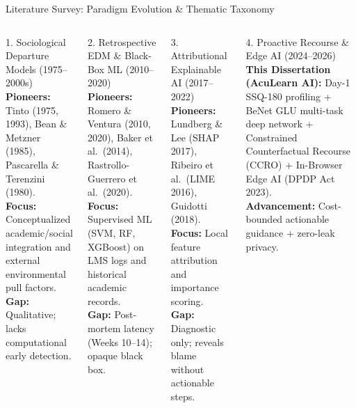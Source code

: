 \documentclass{beamer}
\begin{document}
\begin{frame}[t]{Literature Survey: Paradigm Evolution \& Thematic Taxonomy}
  \begin{columns}[T]
    \begin{block}{\scriptsize 1. Sociological Departure Models (1975--2000s)}
      \fontsize{5.4pt}{6.8pt}\selectfont
      \textbf{Pioneers:} Tinto (1975, 1993), Bean \& Metzner (1985), Pascarella \& Terenzini (1980).\\[2pt]
      \textbf{Focus:} Conceptualized academic/social integration and external environmental pull factors.\\[2pt]
      \textbf{Gap:} Qualitative; lacks computational early detection.
    \end{block}
    \vspace{4pt}
    \begin{block}{\scriptsize 2. Retrospective EDM \& Black-Box ML (2010--2020)}
      \fontsize{5.4pt}{6.8pt}\selectfont
      \textbf{Pioneers:} Romero \& Ventura (2010, 2020), Baker et al.\ (2014), Rastrollo-Guerrero et al.\ (2020).\\[2pt]
      \textbf{Focus:} Supervised ML (SVM, RF, XGBoost) on LMS logs and historical academic records.\\[2pt]
      \textbf{Gap:} Post-mortem latency (Weeks 10--14); opaque black box.
    \end{block}

    \begin{block}{\scriptsize 3. Attributional Explainable AI (2017--2022)}
      \fontsize{5.4pt}{6.8pt}\selectfont
      \textbf{Pioneers:} Lundberg \& Lee (SHAP 2017), Ribeiro et al.\ (LIME 2016), Guidotti (2018).\\[2pt]
      \textbf{Focus:} Local feature attribution and importance scoring.\\[2pt]
      \textbf{Gap:} Diagnostic only; reveals blame without actionable steps.
    \end{block}
    \vspace{4pt}
    \begin{block}{\scriptsize 4. Proactive Recourse \& Edge AI (2024--2026)}
      \fontsize{5.4pt}{6.8pt}\selectfont
      \textbf{This Dissertation (AcuLearn AI):} Day-1 SSQ-180 profiling + BeNet GLU multi-task deep network + Constrained Counterfactual Recourse (CCRO) + In-Browser Edge AI (DPDP Act 2023).\\[2pt]
      \textbf{Advancement:} Cost-bounded actionable guidance + zero-leak privacy.
    \end{block}
  \end{columns}
\end{frame}
\end{document}
